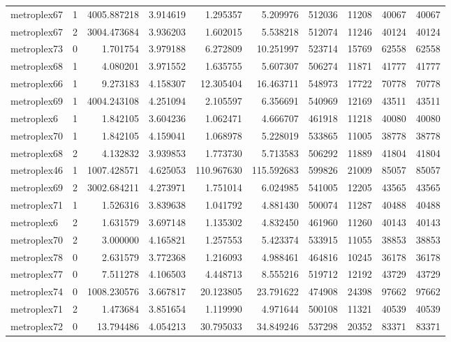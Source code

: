 \begin{longtable}{|l|r|r|r|r|r|r|r|r|r|}
metroplex67 & 1 & 4005.887218 & 3.914619 & 1.295357 & 5.209976 & 512036 & 11208 & 40067 & 40067 \\
metroplex67 & 2 & 3004.473684 & 3.936203 & 1.602015 & 5.538218 & 512074 & 11246 & 40124 & 40124 \\
metroplex73 & 0 & 1.701754 & 3.979188 & 6.272809 & 10.251997 & 523714 & 15769 & 62558 & 62558 \\
metroplex68 & 1 & 4.080201 & 3.971552 & 1.635755 & 5.607307 & 506274 & 11871 & 41777 & 41777 \\
metroplex66 & 1 & 9.273183 & 4.158307 & 12.305404 & 16.463711 & 548973 & 17722 & 70778 & 70778 \\
metroplex69 & 1 & 4004.243108 & 4.251094 & 2.105597 & 6.356691 & 540969 & 12169 & 43511 & 43511 \\
metroplex6 & 1 & 1.842105 & 3.604236 & 1.062471 & 4.666707 & 461918 & 11218 & 40080 & 40080 \\
metroplex70 & 1 & 1.842105 & 4.159041 & 1.068978 & 5.228019 & 533865 & 11005 & 38778 & 38778 \\
metroplex68 & 2 & 4.132832 & 3.939853 & 1.773730 & 5.713583 & 506292 & 11889 & 41804 & 41804 \\
metroplex46 & 1 & 1007.428571 & 4.625053 & 110.967630 & 115.592683 & 599826 & 21009 & 85057 & 85057 \\
metroplex69 & 2 & 3002.684211 & 4.273971 & 1.751014 & 6.024985 & 541005 & 12205 & 43565 & 43565 \\
metroplex71 & 1 & 1.526316 & 3.839638 & 1.041792 & 4.881430 & 500074 & 11287 & 40488 & 40488 \\
metroplex6 & 2 & 1.631579 & 3.697148 & 1.135302 & 4.832450 & 461960 & 11260 & 40143 & 40143 \\
metroplex70 & 2 & 3.000000 & 4.165821 & 1.257553 & 5.423374 & 533915 & 11055 & 38853 & 38853 \\
metroplex78 & 0 & 2.631579 & 3.772368 & 1.216093 & 4.988461 & 464816 & 10245 & 36178 & 36178 \\
metroplex77 & 0 & 7.511278 & 4.106503 & 4.448713 & 8.555216 & 519712 & 12192 & 43729 & 43729 \\
metroplex74 & 0 & 1008.230576 & 3.667817 & 20.123805 & 23.791622 & 474908 & 24398 & 97662 & 97662 \\
metroplex71 & 2 & 1.473684 & 3.851654 & 1.119990 & 4.971644 & 500108 & 11321 & 40539 & 40539 \\
metroplex72 & 0 & 13.794486 & 4.054213 & 30.795033 & 34.849246 & 537298 & 20352 & 83371 & 83371 \\

\end{longtable}
